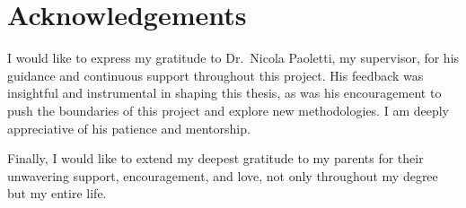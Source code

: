 \chapter*{Acknowledgements}

I would like to express my gratitude to Dr.\ Nicola Paoletti, my supervisor,
for his guidance and continuous support throughout this project.
His feedback was insightful and instrumental in shaping this thesis,
as was his encouragement to push the boundaries of this project
and explore new methodologies.
I am deeply appreciative of his patience and mentorship.

Finally, I would like to extend my deepest gratitude to my parents
for their unwavering support, encouragement, and love,
not only throughout my degree but my entire life.
